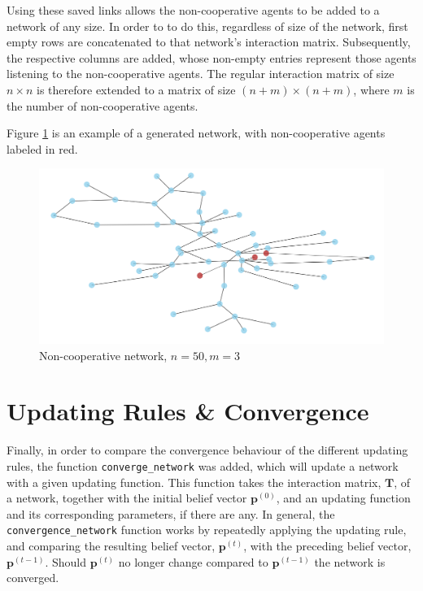 \documentclass[a4paper, 12pt]{report}
\newcommand{\T}{\bm{T}}
\begin{document}
Using these saved links allows the non-cooperative agents to be added to a network of any size. In order to to do this, regardless of size of the network, first empty rows are concatenated to that network's  interaction matrix. Subsequently, the respective columns are added, whose non-empty entries represent those agents listening to the non-cooperative agents. The regular interaction matrix of size $n \times n$ is therefore extended to a matrix of size $(n+m) \times (n+m)$, where $m$ is the number of non-cooperative agents.

Figure \ref{network:noncoop} is an example of a generated network, with non-cooperative agents labeled in red.

\begin{center}
    \begin{figure}[!htbp]
        \centering
        \includegraphics[width=.75\textwidth]{ThesisKI/Images/NonCoopGraph_cropped.png}
        \caption{Non-cooperative network, $n=50, m=3$}
        \label{network:noncoop}
    \end{figure}
\end{center}

\section{Updating Rules \& Convergence}
\label{convergence:implementation}
Finally, in order to compare the convergence behaviour of the different updating rules, the function \texttt{converge\_network} was added, which will update a network with a given updating function. This function takes the interaction matrix, $\T$, of a network, together with the initial belief vector $\bm{p}^{(0)}$, and an updating function and its corresponding parameters, if there are any. In general, the \texttt{convergence\_network} function works by repeatedly applying the updating rule, and comparing the resulting belief vector, $\bm{p}^{(t)}$, with the preceding belief vector, $\bm{p}^{(t-1)}$. Should $\bm{p}^{(t)}$ no longer change compared to $\bm{p}^{(t-1)}$ the network is converged.
\end{document}
